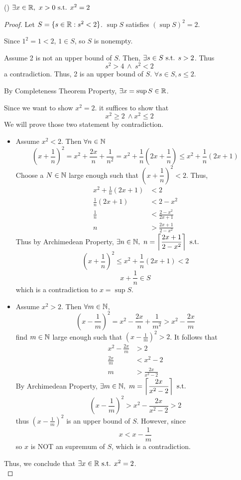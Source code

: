 \documentclass[a4paper,12pt]{article}
\begin{document}
\begin{theorem} ()
    \(\exists x\in\mathbb{R},\ x>0\text{ s.t. } x^2=2\)
    \begin{proof}
        Let \(S=\{s\in\mathbb{R}:s^2<2\}\).
         \(\sup S\) satisfies \((\sup S)^2=2\).

        Since \(1^2=1<2\), \(1\in S\), so \(S\) is nonempty.

        Assume 2 is not an upper bound of \(S\). Then, \(\exists s\in S\text{ s.t. }  s>2\). Thus 
        \[s^2>4\ \wedge\  s^2<2\]
        a contradiction. Thus, 2 is an upper bound of \(S\). \(\forall s\in S, s\le 2\).

        By Completeness Theorem Property, \(\exists x=\sup S\in\mathbb{R}\). 
        
        Since we want to show \(x^2=2\). it suffices to show that 
        \[x^2\ge 2\ \wedge x^2\le 2\]
        We will prove those two statement by contradiction.
        \begin{itemize}
            \item Assume \(x^2<2\). Then \(\forall n\in \mathbb{N}\)
            \[(x+\dfrac{1}{n})^2=x^2+\frac{2x }{n } +\frac{1}{ n^2 }=x^2+\frac{1}{n }(2x+\frac{1}{n } )\le x^2+\frac{1}{n }(2x+1)\]
             Choose a \(N\in\mathbb{N}\) large enough such that \((x+\dfrac{1}{n })^2<2\). Thus, 
            \begin{align*}
                x^2+\frac{1}{n}(2x+1)&<2\\
                \frac{1}{n }(2x+1)&<2-x^2\\
                \frac{1}{n}&<\frac{2-x^2}{2x+1 }\\
                n&>\frac{2x+1}{2-x^2}
            \end{align*}
            Thus by Archimedean Property, \(\exists n\in\N,\ n=\ds\left\lceil\frac{2x+1}{2-x^2}\right\rceil\st \)
            \[(x+\frac{1}{n })^2\le x^2+\frac{1 }{n }(2x+1)<2\]
            \[x+\frac{1 }{n }\in S\]
            which is a contradiction to \(x=\sup S\).
            \item Assume \(x^2>2\). Then \(\forall m\in\mathbb{N}\), 
            \[(x-\frac{1}{m})^2=x^2-\frac{2x }{n }+\frac{1 }{m^2 }>x^2-\frac{2x }{m}\]
             find \(m\in\mathbb{N}\) large enough such that  \((x-\frac{1}{m })^2>2\). It follows that 
            \begin{align*}
                x^2-\frac{2x }{m }&>2\\
                \frac{2x }{m }&<x^2-2\\
                m&>\frac{2x }{x^2-2}
            \end{align*}
            By Archimedean Property, \(\exists m\in\N,\ m=\ds\left\lceil\frac{2x}{x^2-2}\right\rceil\st\)
            \[(x-\frac{1}{m })^2>x^2-\frac{2x }{x^2-2 }>2\]
            thus \((x-\frac{1}{m })^2\) is an upper bound of \(S\). However, since 
            \[x<x-\frac{1}{m }\]
            so \(x\) is NOT an supremum of \(S\), which is a contradiction. 
        \end{itemize}
        Thus, we conclude that \(\exists x\in\mathbb{R}\text{ s.t. } x^2=2\).\\
    \end{proof}
\end{theorem}
\end{document}
